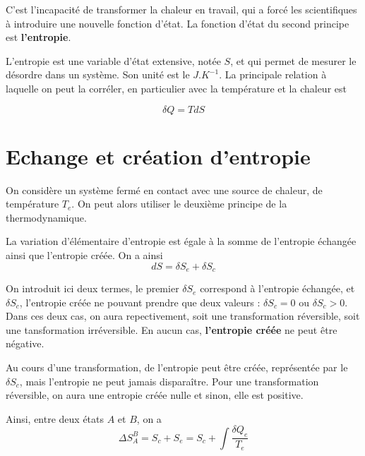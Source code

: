 C'est l'incapacité de transformer la chaleur en travail, qui a forcé les scientifiques à introduire une nouvelle fonction d'état. La fonction d'état du second principe est \textbf{l'entropie}.

\begin{definition}[Entropie]
L'entropie est une variable d'état extensive, notée $S$, et qui permet de mesurer le désordre dans un système. Son unité est le $J.K^{-1}$. La principale relation à laquelle on peut la corréler, en particulier avec la température et la chaleur est

\begin{equation}
\delta Q=TdS
\end{equation}

\end{definition}



\section{Echange et création d'entropie}

On considère un système fermé en contact avec une source de chaleur, de température $T_e$. On peut alors utiliser le deuxième principe de la thermodynamique.
\begin{theorem}
La variation d'élémentaire d'entropie est égale à la somme de l'entropie échangée ainsi que l'entropie créée. On a ainsi
\begin{equation}
dS=\delta S_e + \delta S_c
\end{equation}
\end{theorem}
On introduit ici deux termes, le premier $\delta S_e$ correspond à l'entropie échangée, et $\delta S_c$, l'entropie créée ne pouvant prendre que deux valeurs : $\delta S_c = 0$ ou $\delta S_c > 0$. Dans ces deux cas, on aura repectivement, soit une transformation réversible, soit une tansformation irréversible. En aucun cas, \textbf{l'entropie créée} ne peut être négative.\\

\begin{proposition}
Au cours d'une transformation, de l'entropie peut être créée, représentée par le $\delta S_c$, mais l'entropie ne peut jamais disparaître. Pour une transformation réversible, on aura une entropie créée nulle et sinon, elle est positive.
\end{proposition}

Ainsi, entre deux états $A$ et $B$, on a
\begin{equation}
\Delta S_A^B=S_c+S_e=S_c+\int \frac{\delta Q_e}{T_e}
\end{equation}

